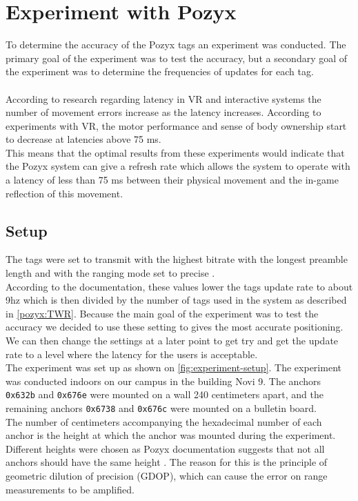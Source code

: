 \section{Experiment with Pozyx}
To determine the accuracy of the Pozyx tags an experiment was conducted.
The primary goal of the experiment was to test the accuracy, but a secondary goal of the experiment was to determine the frequencies of updates for each tag.
\\\\
According to research regarding latency in VR \cite{WaltemateThomas2016Tiol} and interactive systems \cite{10.1145/169059.169431} the number of movement errors increase as the latency increases.
According to experiments with VR, the motor performance and sense of body ownership start to decrease at latencies above 75 ms.\\
This means that the optimal results from these experiments would indicate that the Pozyx system can give a refresh rate which allows the system to operate with a latency of less than 75 ms between their physical movement and the in-game reflection of this movement.

\subsection{Setup}
The tags were set to transmit with the highest bitrate with the longest preamble length and with the ranging mode set to precise \cite{pozyx-Performance}.\\
According to the documentation, these values lower the tags update rate to about 9hz which is then divided by the number of tags used in the system as described in \autoref{pozyx:TWR}.
Because the main goal of the experiment was to test the accuracy we decided to use these setting to gives the most accurate positioning.\\
We can then change the settings at a later point to get try and get the update rate to a level where the latency for the users is acceptable.\\
The experiment was set up as shown on \autoref{fig:experiment-setup}.
The experiment was conducted indoors on our campus in the building Novi 9.
The anchors \texttt{0x632b} and \texttt{0x676e} were mounted on a wall 240 centimeters apart, and the remaining anchors \texttt{0x6738} and \texttt{0x676c} were mounted on a bulletin board.\\
The number of centimeters accompanying the hexadecimal number of each anchor is the height at which the anchor was mounted during the experiment.
Different heights were chosen as Pozyx documentation suggests that not all anchors should have the same height \cite{pozyx-AnchorHeights}.
The reason for this is the principle of geometric dilution of precision (GDOP), which can cause the error on range measurements to be amplified.

